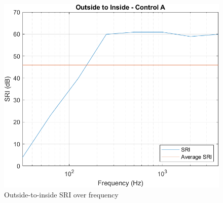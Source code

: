 \documentclass[10pt, twocolumn]{article}
\begin{document}
            \begin{figure}[H]
                \centering
                \includegraphics[scale = 0.6]{resources/O2IControlA.png}
                \caption{Outside-to-inside SRI over frequency}
                \label{MATLAB2}
            \end{figure}
\end{document}
